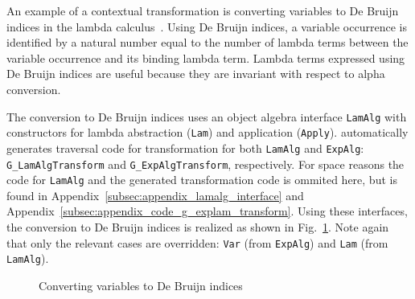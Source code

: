An example of a contextual transformation is converting variables to De Bruijn indices in the lambda calculus~\cite{deBruijn1972381}.
Using De Bruijn indices, a variable occurrence is identified by a natural number equal to the number of lambda terms between the variable occurrence and its binding lambda term.
Lambda terms expressed using De Bruijn indices are useful because they are invariant with respect to alpha conversion.

The conversion to De Bruijn indices uses an object algebra interface
\lstinline{LamAlg} with constructors for lambda abstraction
(\lstinline{Lam}) and application (\lstinline{Apply}). \name
automatically generates traversal code for transformation for both
\lstinline{LamAlg} and \lstinline{ExpAlg}:
\lstinline{G_LamAlgTransform} and \lstinline{G_ExpAlgTransform},
respectively. For space reasons the code for \lstinline{LamAlg} and
the generated transformation code is ommited here, but is found
in Appendix~\ref{subsec:appendix_lamalg_interface} and
Appendix~\ref{subsec:appendix_code_g_explam_transform}. Using these
interfaces, the conversion to De Bruijn indices is
  realized as shown in Fig.~\ref{DeBruijn}. Note again that only the
  relevant cases are overridden: \lstinline{Var} (from
  \lstinline{ExpAlg}) and \lstinline{Lam} (from \lstinline{LamAlg}).


\begin{figure}[t]
\nocaptionrule
\caption{Converting variables to De Bruijn indices}
\label{DeBruijn}
\end{figure}




